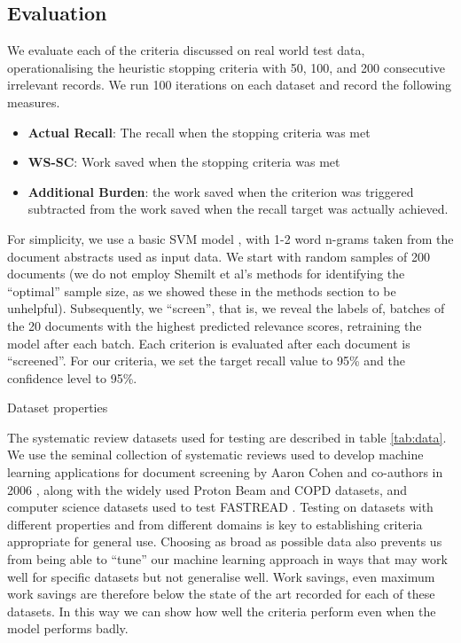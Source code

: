 \documentclass{bmcart}
\begin{document}
	\subsection*{Evaluation}
	
	We evaluate each of the criteria discussed on real world test data, operationalising the heuristic stopping criteria with 50, 100, and 200 consecutive irrelevant records. We run 100 iterations on each dataset and record the following measures.
	\begin{itemize}
		\item \textbf{Actual Recall}: The recall when the stopping criteria was met
		\item \textbf{WS-SC}: Work saved when the stopping criteria was met
		\item \textbf{Additional Burden}: the work saved when the criterion was triggered subtracted from the work saved when the recall target was actually achieved.

	\end{itemize}
	For simplicity, we use a basic SVM model \cite{Cortes95, Pedregosa2011}, with 1-2 word n-grams taken from the document abstracts used as input data. We start with random samples of 200 documents (we do not employ Shemilt et al's methods for identifying the ``optimal'' sample size, as we showed these in the methods section to be unhelpful). Subsequently, we ``screen'', that is, we reveal the labels of, batches of the 20 documents with the highest predicted relevance scores, retraining the model after each batch. Each criterion is evaluated after each document is ``screened''.
	 For our criteria, we set the target recall value to 95\% and the confidence level to 95\%.
	
	
	\begin{table}
		
		\caption{Dataset properties}
		\label{tab:data}
	\end{table}
	
	The systematic review datasets used for testing are described in table \ref{tab:data}. We use the seminal collection of systematic reviews used to develop machine learning applications for document screening by Aaron Cohen and co-authors in 2006 \cite{Cohen2006}, along with the widely used Proton Beam \cite{Terasawa2009} and COPD \cite{Castaldi2009} datasets, and computer science datasets used to test FASTREAD \cite{Yu2019}. Testing on datasets with different properties and from different domains is key to establishing criteria appropriate for general use. Choosing as broad as possible data also prevents us from being able to ``tune'' our machine learning approach in ways that may work well for specific datasets but not generalise well. Work savings, even maximum work savings are therefore below the state of the art recorded for each of these datasets. In this way we can show how well the criteria perform even when the model performs badly.
	
\end{document}
